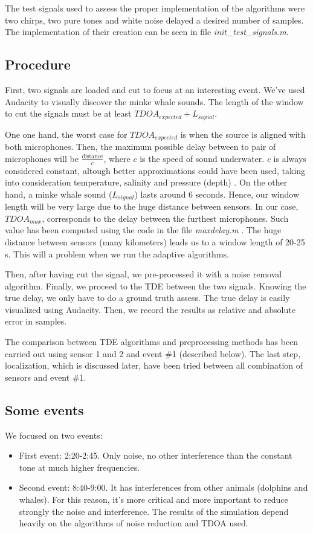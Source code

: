   The test signals used to assess the proper implementation of the algorithms were two chirps, two pure tones and white noise delayed a desired number of samples. The implementation of their creation can be seen in file \emph{init\_test\_signals.m}\cite{inittestsignals.m}.
  
\subsection{Procedure}
  First, two signals are loaded and cut to focus at an interesting event. We've used Audacity to visually discover the minke whale sounds. The length of the window to cut the signals must be at least $TDOA_{expected}+L_{signal}$.
  
  One one hand, the worst case for $TDOA_{expected}$ is when the source is aligned with both microphones. Then, the maximum possible delay between to pair of microphones will be $\frac{\text{distance}}{c}$, where $c$ is the speed of sound underwater. $c$ is always considered constant, altough better approximations could have been used, taking into consideration temperature, salinity and pressure (depth) \cite{speed-sound-seawater}. On the other hand, a minke whale sound ($L_{signal}$) lasts around 6 seconds. Hence, our window length will be very large due to the huge distance between sensors. In our case, $TDOA_{max}$, corresponds to the delay between the furthest microphones. Such value has been computed using the code in the file \emph{maxdelay.m} \cite{maxdelay.m}. The huge distance between sensors (many kilometers) leads us to a window length of 20-25 s. This will a problem when we run the adaptive algorithms.

  Then, after having cut the signal, we pre-processed it with a noise removal algorithm. Finally, we proceed to the TDE between the two signals. Knowing the true delay, we only have to do a ground truth assess. The true delay is easily visualized using Audacity. Then, we record the results as relative and absolute error in samples.
  
  The comparison between TDE algorithms and preprocessing methods has been carried out using sensor 1 and 2 and event \#1 (described below). The last step, localization, which is discussed later, have been tried between all combination of sensors and event \#1.

\subsection{Some events}
  We focused on two events:
  \begin{itemize}
    \item First event: 2:20-2:45. Only noise, no other interference than the constant tone at much higher frequencies.
    \item Second event: 8:40-9:00. It has interferences from other animals (dolphins and whales). For this reason, it's more critical and more important to reduce strongly the noise and interference. The results of the simulation depend heavily on the algorithms of noise reduction and TDOA used.
  \end{itemize}
